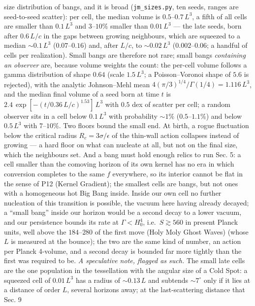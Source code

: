 \documentclass[
  11pt,
]{article}
\begin{document}
size distribution of bangs, and it is broad (\texttt{jm\_sizes.py}, ten
seeds, ranges are seed-to-seed scatter): per cell, the median volume is
\(0.5\)--\(0.7\,L^3\), a fifth of all cells are smaller than
\(0.1\,L^3\) and \(3\)--\(10\%\) smaller than \(0.01\,L^3\) --- the late
seeds, born after \(0.6\,L/c\) in the gaps between growing neighbours,
which are squeezed to a median \(\sim 0.1\,L^3\) (\(0.07\)--\(0.16\))
and, after \(L/c\), to \(\sim 0.02\,L^3\) (\(0.002\)--\(0.06\); a
handful of cells per realization). Small bangs are therefore not rare;
small bangs \emph{containing an observer} are, because volume weights
the count: the per-cell volume follows a gamma distribution of shape
\(0.64\) (scale \(1.5\,L^3\); a Poisson--Voronoi shape of \(5.6\) is
rejected), with the analytic Johnson--Mehl mean
\(4(\pi/3)^{1/4}/\Gamma(1/4) = 1.116\,L^3\), and the median final volume
of a seed born at time \(t\) is
\(2.4\,\exp[-(t/0.36\,L/c)^{1.53}]\,L^3\) with \(0.5\) dex of scatter
per cell; a random observer sits in a cell below \(0.1\,L^3\) with
probability \(\sim 1\%\) (\(0.5\)--\(1.1\%\)) and below \(0.5\,L^3\)
with \(7\)--\(10\%\). Two floors bound the small end. At birth, a rogue
fluctuation below the critical radius \(R_c = 3\sigma/\epsilon\) of the
thin-wall action collapses instead of growing --- a hard floor on what
can nucleate at all, but not on the final size, which the neighbours
set. And a bang must hold enough relics to run Sec. 5: a cell smaller
than the comoving horizon of its own kernel has no era in which
conversion completes to the same \(f\) everywhere, so its interior
cannot be flat in the sense of P12 (Kernel Gradient); the smallest cells
are bangs, but not ones with a homogeneous hot Big Bang inside. Inside
our own cell no further nucleation of this transition is possible, the
vacuum here having already decayed; a ``small bang'' inside our horizon
would be a second decay to a lower vacuum, and our persistence bounds
its rate at \(\Gamma < H_0^4\), i.e.~\(S \gtrsim 560\) in present Planck
units, well above the \(184\)--\(280\) of the first move (Holy Moly
Ghost Waves) (whose \(L\) is measured at the bounce); the two are the
same kind of number, an action per Planck 4-volume, and a second decay
is bounded far more tightly than the first was required to be. \emph{A
speculative note, flagged as such.} The small late cells are the one
population in the tessellation with the angular size of a Cold Spot: a
squeezed cell of \(0.01\,L^3\) has a radius of \(\sim 0.13\,L\) and
subtends \(\sim 7^\circ\) only if it lies at a distance of order \(L\),
several horizons away; at the last-scattering distance that Sec. 9
\end{document}
